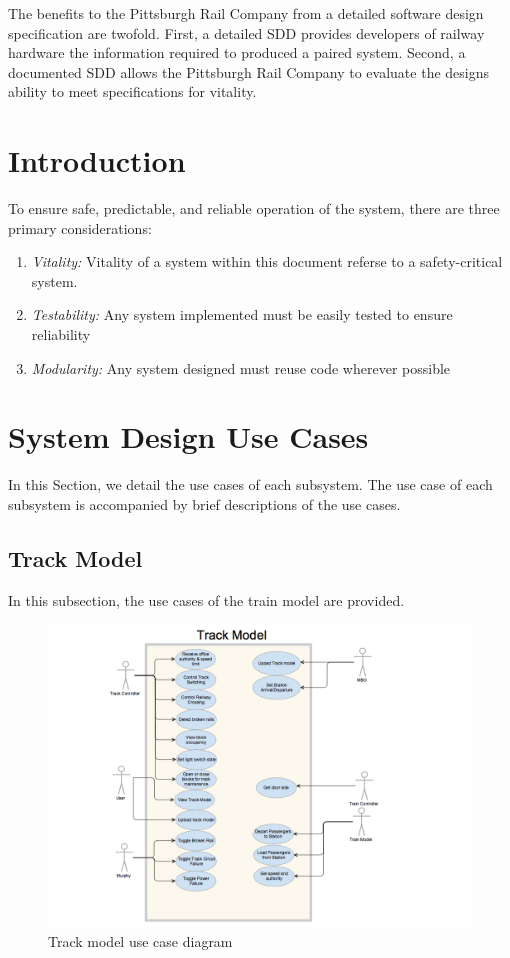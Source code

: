 \documentclass[]{article}
\begin{document}
The benefits to the Pittsburgh Rail Company from  a detailed software design specification are twofold. First, a detailed SDD provides developers of railway hardware the information required to produced a paired system. Second, a documented SDD allows the Pittsburgh Rail Company to evaluate the designs ability to meet specifications for vitality.

\section{Introduction}
To ensure safe, predictable, and reliable operation of the system, there are three primary considerations:
\begin{enumerate}
	\item \emph{Vitality:} Vitality of a system within this document referse to a safety-critical system.
	\item \emph{Testability:} Any system implemented must be easily tested to ensure reliability
	\item \emph{Modularity:} Any system designed must reuse code wherever possible
\end{enumerate}

\section{System Design Use Cases}
In this Section, we detail the use cases of each subsystem. The use case of each subsystem is accompanied by brief descriptions of the use cases.



\subsection{Track Model}
In this subsection, the use cases of the train model are provided.

\begin{figure}[H]
	\centering
	\includegraphics[scale=.15]{trackmodelusecase.png}
	\caption{Track model use case diagram}
\end{figure}
\end{document}
